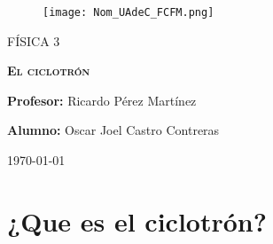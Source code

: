 \documentclass[12pt]{article}
\begin{document}
		
		\begin{titlepage}
		
			\centering
			{\bfseries
			\begin{figure}[h!]
	
				\centering
				\texttt{[image: Nom\_UAdeC\_FCFM.png]}  						
			\end{figure}
			\par}
			\vspace{2cm}
			{\scshape\LARGE FÍSICA 3 \par}
			\vspace{3cm}
			{\scshape\Huge \textbf{El ciclotrón} \par}
			\vfill
			{\LARGE \textbf{Profesor:} Ricardo Pérez Martínez \par}
			\vspace{3cm}
			{\LARGE \textbf{Alumno:} Oscar Joel Castro Contreras \par}
			\vfill
			{\Large \today \par}
			\thispagestyle{empty}
			
		\end{titlepage}
	
		\newpage
		
		\tableofcontents		
		
		\newpage		
		
		\section{¿Que es el ciclotrón?}\label{sec:¿Que es el ciclotrón?}
\end{document}
